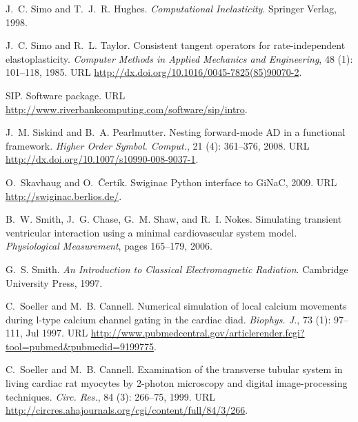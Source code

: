 \begin{thebibliography}{467}
J.~C. Simo and T.~J.~R. Hughes.
\newblock \emph{Computational Inelasticity}.
\newblock Springer Verlag, 1998.

J.~C. Simo and R.~L. Taylor.
\newblock Consistent tangent operators for rate-independent elastoplasticity.
\newblock \emph{Computer Methods in Applied Mechanics and Engineering},
  48 (1): 101--118, 1985.
\newblock URL \url{http://dx.doi.org/10.1016/0045-7825(85)90070-2}.

SIP.
\newblock Software package.
\newblock URL \url{http://www.riverbankcomputing.com/software/sip/intro}.

J.~M. Siskind and B.~A. Pearlmutter.
\newblock Nesting forward-mode {AD} in a functional framework.
\newblock \emph{Higher Order Symbol. Comput.}, 21 (4):
  361--376, 2008.
\newblock URL \url{http://dx.doi.org/10.1007/s10990-008-9037-1}.

O.~Skavhaug and O.~\v{C}ert\'{i}k.
\newblock Swiginac {P}ython interface to {GiNaC}, 2009.
\newblock URL \url{http://swiginac.berlios.de/}.

B.~W. Smith, J.~G. Chase, G.~M. Shaw, and R.~I. Nokes.
\newblock Simulating transient ventricular interaction using a minimal
  cardiovascular system model.
\newblock \emph{Physiological Measurement}, pages 165--179, 2006.

G.~S. Smith.
\newblock \emph{An Introduction to Classical Electromagnetic Radiation}.
\newblock Cambridge University Press, 1997.

C.~Soeller and M.~B. Cannell.
\newblock Numerical simulation of local calcium movements during l-type calcium
  channel gating in the cardiac diad.
\newblock \emph{Biophys. J.}, 73 (1): 97--111, Jul 1997.
\newblock URL
  \url{http://www.pubmedcentral.gov/articlerender.fcgi?tool=pubmed&pubmedid=9199775}.

C.~Soeller and M.~B. Cannell.
\newblock Examination of the transverse tubular system in living cardiac rat
  myocytes by 2-photon microscopy and digital image-processing techniques.
\newblock \emph{Circ. Res.}, 84 (3): 266--75, 1999.
\newblock URL \url{http://circres.ahajournals.org/cgi/content/full/84/3/266}.


\end{thebibliography}
